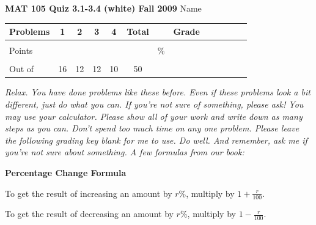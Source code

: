 \documentclass[12pt]{article}
\begin{document}
{\bf MAT 105 Quiz 3.1-3.4 (white) Fall 2009} \hspace{.4in} {\large Name} \hrulefill

\hrulefill


\begin{center}

\begin{tabular}
{|l|c|c|c|c|c|c|c|c|c|c|c|c|} \hline

 Problems & \hspace{5 pt} 1 \hspace{5 pt}  & \hspace{5 pt} 2 \hspace{5 pt} & \hspace{5 pt} 3 \hspace{5 pt} & \hspace{5 pt} 4 \hspace{5 pt} &  \hspace{5 pt} Total  \hspace{5 pt} & &  \hspace{5 pt} Grade \hspace{5 pt}  \\ \hline
&&&&& &&\\  
Points &&&&& &    \hspace{.8in}\% &  \\ 
&&&&& && \\  \hline
Out of & 16 & 12  & 12 & 10 &50 & & \\ \hline

\end {tabular}
 
\end{center}

 \emph{Relax.  You have done problems like these before.  Even if these problems look a bit different, just do what you can.  If you're not sure of something, please ask! You may use your calculator.  Please show all of your work and write down as many steps as you can.  Don't spend too much time on any one problem.  Please leave the following grading key blank for me to use.  Do well.  And remember, ask me if you're not sure about something. A few formulas from our book:}
  \vspace{.2in}
 
  \begin{center}
\textbf{Percentage Change Formula}
\vspace{.1in}

To get the result of increasing an amount by $r$\%, multiply by $1+\frac{r}{100}.$
\vspace{.1in}

To get the result of decreasing an amount by $r$\%, multiply by $1-\frac{r}{100}.$
 \end{center}
 
\end{document}
